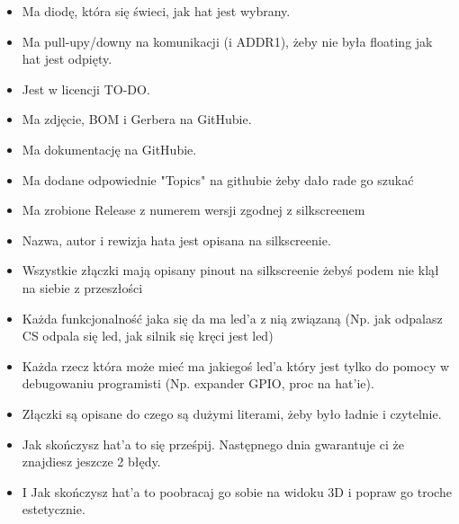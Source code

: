 \documentclass[b5paper, 10pt, twoside]{book}
\begin{document}
\begin{itemize}
  \item Ma diodę, która się świeci, jak hat jest wybrany.
  \item Ma pull-upy/downy na komunikacji (i ADDR1), żeby nie była floating jak hat jest odpięty.
  \item Jest w licencji TO-DO. %
  \item Ma zdjęcie, BOM i Gerbera na GitHubie.
  \item Ma dokumentację na GitHubie.
  \item Ma dodane odpowiednie "Topics" na githubie żeby dało rade go szukać
  \item Ma zrobione Release z numerem wersji zgodnej z silkscreenem
  \item Nazwa, autor i rewizja hata jest opisana na silkscreenie.
  \item Wszystkie złączki mają opisany pinout na silkscreenie żebyś podem nie klął na siebie z przeszłości
  \item Każda funkcjonalność jaka się da ma led'a z nią związaną (Np. jak odpalasz CS odpala się led, jak silnik się kręci jest led)
  \item Każda rzecz która może mieć ma jakiegoś led'a który jest tylko do pomocy w debugowaniu programisti (Np. expander GPIO, proc na hat'ie). 
  \item Złączki są opisane do czego są dużymi literami, żeby było ładnie i czytelnie.
  \item Jak skończysz hat'a to się prześpij. Następnego dnia gwarantuje ci że znajdiesz jeszcze 2 błędy.
  \item I Jak skończysz hat'a to poobracaj go sobie na widoku 3D i popraw go troche estetycznie. 
\end{itemize}
\end{document}
